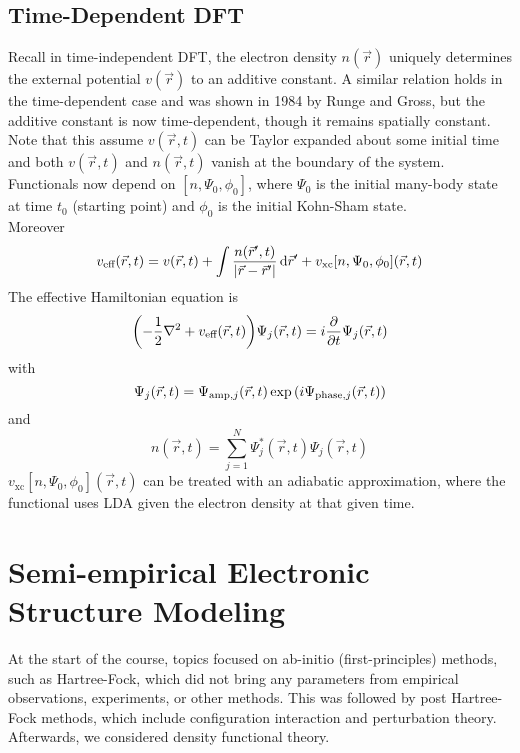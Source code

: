 \documentclass[12pt,a4paper,titlepage]{article}
\newcommand{\trm}[1]{\textrm{#1}} %
\begin{document}
\subsection{Time-Dependent DFT}
Recall in time-independent DFT, the electron density $n(\vec{r})$ uniquely determines the external potential $v(\vec{r})$ to an additive constant. A similar relation holds in the time-dependent case and was shown in 1984 by Runge and Gross, but the additive constant is now time-dependent, though it remains spatially constant. Note that this assume $v(\vec{r},t)$ can be Taylor expanded about some initial time and both $v(\vec{r},t)$ and $n(\vec{r},t)$ vanish at the boundary of the system.\\

Functionals now depend on $[n,\Psi_{0},\phi_{0}]$, where $\Psi_{0}$ is the initial many-body state at time $t_{0}$ (starting point) and $\phi_{0}$ is the initial Kohn-Sham state.\\

Moreover
\begin{equation}
v_{\trm{eff}}(\vec{r},t)=v(\vec{r},t)+\int\frac{n(\vec{r}^{\prime},t)}{\abs{\vec{r}-\vec{r}^{\prime}}}\dd{\vec{r}^{\prime}}+v_{\trm{xc}}[n,\Psi_{0},\phi_{0}](\vec{r},t)
\end{equation}
The effective Hamiltonian equation is
\begin{equation}
\qty(-\frac{1}{2}\nabla^{2}+v_{\trm{eff}}(\vec{r},t))\Psi_{j}(\vec{r},t)=i\pdv{t}\Psi_{j}(\vec{r},t)
\end{equation}
with
\begin{equation}
\Psi_{j}(\vec{r},t)=\Psi_{\trm{amp},j}(\vec{r},t)\exp\qty(i\Psi_{\trm{phase},j}(\vec{r},t))
\end{equation}
and
\begin{equation}
n(\vec{r},t)=\sum_{j=1}^{N}\Psi_{j}^{*}(\vec{r},t)\Psi_{j}(\vec{r},t)
\end{equation}
$v_{\trm{xc}}[n,\Psi_{0},\phi_{0}](\vec{r},t)$ can be treated with an adiabatic approximation, where the functional uses LDA given the electron density at that given time.

\newpage
\section{Semi-empirical Electronic Structure Modeling}
At the start of the course, topics focused on ab-initio (first-principles) methods, such as Hartree-Fock, which did not bring any parameters from empirical observations, experiments, or other methods. This was followed by post Hartree-Fock methods, which include configuration interaction and perturbation theory. Afterwards, we considered density functional theory.\\
\end{document}
